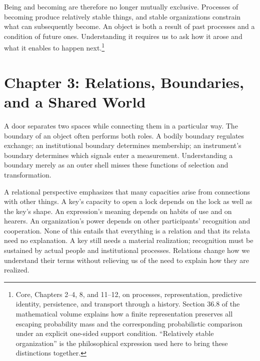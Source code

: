 \documentclass[
  english,
  11pt,
  oneside]{book}
\begin{document}
\begingroup{}

Being and becoming are therefore no longer mutually exclusive. Processes of becoming produce relatively stable things, and stable organizations constrain what can subsequently become. An object is both a result of past processes and a condition of future ones. Understanding it requires us to ask how it arose and what it enables to happen next.\footnote{\hypertarget{ph-note-7}{}Core, Chapters 2--4, 8, and 11--12, on processes, representation, predictive identity, persistence, and transport through a history. Section 36.8 of the mathematical volume explains how a finite representation preserves all escaping probability mass and the corresponding probabilistic comparison under an explicit one-sided support condition. ``Relatively stable organization'' is the philosophical expression used here to bring these distinctions together.}

\par\endgroup

\chapter{Chapter 3: Relations, Boundaries, and a Shared World}\label{ph-ch-03}

A door separates two spaces while connecting them in a particular way. The boundary of an object often performs both roles. A bodily boundary regulates exchange; an institutional boundary determines membership; an instrument's boundary determines which signals enter a measurement. Understanding a boundary merely as an outer shell misses these functions of selection and transformation.

A relational perspective emphasizes that many capacities arise from connections with other things. A key's capacity to open a lock depends on the lock as well as the key's shape. An expression's meaning depends on habits of use and on hearers. An organization's power depends on other participants' recognition and cooperation. None of this entails that everything is a relation and that its relata need no explanation. A key still needs a material realization; recognition must be sustained by actual people and institutional processes. Relations change how we understand their terms without relieving us of the need to explain how they are realized.
\end{document}
